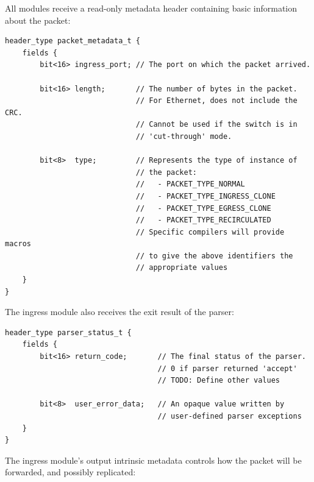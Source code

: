 \documentclass[12pt]{article}
\begin{document}

All modules receive a read-only metadata header containing basic information
about the packet:

\begin{lstlisting}[style=P4style]
header_type packet_metadata_t {
    fields {
        bit<16> ingress_port; // The port on which the packet arrived.

        bit<16> length;       // The number of bytes in the packet. 
                              // For Ethernet, does not include the CRC. 
                              // Cannot be used if the switch is in
                              // 'cut-through' mode.

        bit<8>  type;         // Represents the type of instance of
                              // the packet: 
                              //   - PACKET_TYPE_NORMAL
                              //   - PACKET_TYPE_INGRESS_CLONE
                              //   - PACKET_TYPE_EGRESS_CLONE
                              //   - PACKET_TYPE_RECIRCULATED
                              // Specific compilers will provide macros
                              // to give the above identifiers the
                              // appropriate values
    }
}
\end{lstlisting}

The ingress module also receives the exit result of the parser: 

\begin{lstlisting}[style=P4style]
header_type parser_status_t {
    fields {
        bit<16> return_code;       // The final status of the parser.
                                   // 0 if parser returned 'accept'
                                   // TODO: Define other values 

        bit<8>  user_error_data;   // An opaque value written by
                                   // user-defined parser exceptions
    }
}
\end{lstlisting}

The ingress module's output intrinsic metadata controls how the packet will be
forwarded, and possibly replicated:
\end{document}

